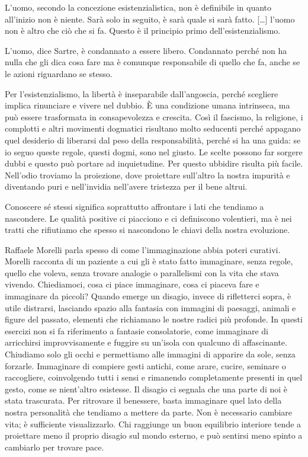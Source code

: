 \documentclass[12pt]{book} %
\begin{document}
L'uomo, secondo la concezione esistenzialistica, non è definibile in quanto all'inizio non è niente. Sarà solo in
seguito, è sarà quale si sarà fatto. […] l'uomo non è altro che ciò che si fa. Questo è il principio primo
dell'esistenzialismo.

L'uomo, dice Sartre, è condannato a essere libero. Condannato perché non ha nulla che gli dica cosa fare ma è comunque
responsabile di quello che fa, anche se le azioni riguardano se stesso.

Per l’esistenzialismo, la libertà è inseparabile dall’angoscia, perché scegliere implica rinunciare e vivere nel dubbio. È una condizione umana intrinseca, ma può essere trasformata in consapevolezza e crescita. Così il fascismo, la religione, i complotti e
altri movimenti dogmatici risultano molto seducenti perché appagano quel desiderio di liberarsi dal peso della
responsabilità, perché si ha una guida: se io seguo queste regole, questi dogmi, sono nel giusto. Le scelte
possono far sorgere dubbi e questo può portare ad inquietudine. Per questo ubbidire risulta più facile. Nell'odio troviamo la
proiezione, dove proiettare sull'altro la nostra impurità e diventando puri e nell'invidia
nell'avere tristezza per il bene altrui.

Conoscere sé stessi significa soprattutto affrontare i lati che tendiamo a nascondere. Le qualità positive ci piacciono e ci definiscono volentieri, ma è nei tratti che rifiutiamo che spesso si nascondono le chiavi della nostra evoluzione.

Raffaele Morelli parla spesso di come l'immaginazione abbia poteri curativi. Morelli racconta di un
paziente a cui gli è stato fatto immaginare, senza regole, quello che voleva, senza trovare analogie o parallelismi con
la vita che stava vivendo. Chiediamoci, cosa ci piace immaginare, cosa ci piaceva fare e immaginare da piccoli?
Quando emerge un disagio, invece di rifletterci sopra, è utile distrarsi, lasciando spazio alla fantasia con immagini di paesaggi, animali e figure del passato, elementi che richiamano le nostre radici più profonde. In questi esercizi non si fa riferimento a fantasie consolatorie, come immaginare di arricchirsi improvvisamente e fuggire su un’isola con qualcuno di affascinante. Chiudiamo solo gli occhi e permettiamo alle immagini di apparire da sole, senza forzarle. Immaginare di compiere gesti antichi, come arare, cucire, seminare o raccogliere, coinvolgendo tutti i sensi e rimanendo completamente presenti in quel gesto, come se nient’altro esistesse.
Il disagio ci segnala che una parte di noi è stata trascurata. Per ritrovare il benessere, basta immaginare quel lato della nostra personalità che tendiamo a mettere da parte. Non è necessario cambiare vita; è sufficiente visualizzarlo. Chi raggiunge un buon equilibrio interiore tende a proiettare meno il proprio disagio sul mondo esterno, e può sentirsi meno spinto a cambiarlo per trovare pace.
\end{document}

